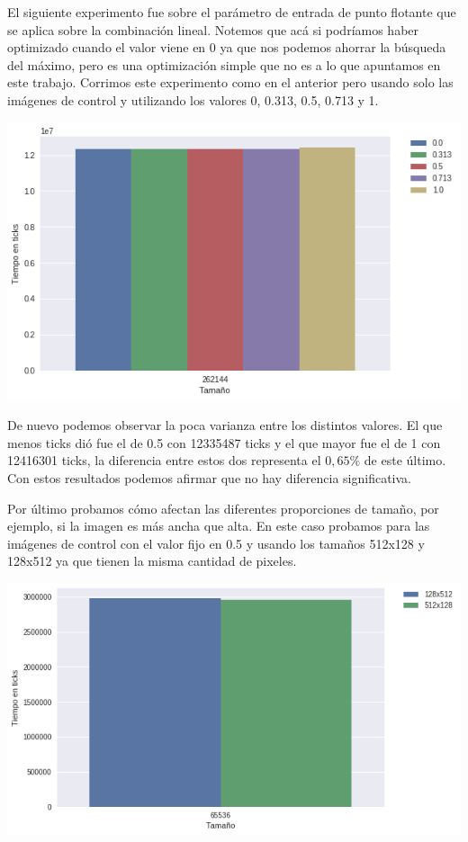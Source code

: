 El siguiente experimento fue sobre el parámetro de entrada de punto flotante que se aplica sobre la combinación lineal. Notemos que acá si podríamos haber optimizado cuando el valor viene en 0 ya que nos podemos ahorrar la búsqueda del máximo, pero es una optimización simple que no es a lo que apuntamos en este trabajo. Corrimos este experimento como en el anterior pero usando solo las imágenes de control y utilizando los valores 0, 0.313, 0.5, 0.713 y 1.

\begin{center} 
	\includegraphics[scale=0.5]{img/maxCloser_PARAM_VAL.png}
\end{center}

De nuevo podemos observar la poca varianza entre los distintos valores. El que menos ticks dió fue el de 0.5 con 12335487 ticks y el que mayor fue el de 1 con 12416301 ticks, la diferencia entre estos dos representa el $0,65\%$ de este último. Con estos resultados podemos afirmar que no hay diferencia significativa.

Por último probamos cómo afectan las diferentes proporciones de tamaño, por ejemplo, si la imagen es más ancha que alta. En este caso probamos para las imágenes de control con el valor fijo en 0.5 y usando los tamaños 512x128 y 128x512 ya que tienen la misma cantidad de pixeles.

\begin{center} 
	\includegraphics[scale=0.5]{img/maxCloser_PARAM_SIZE.png}
\end{center}

